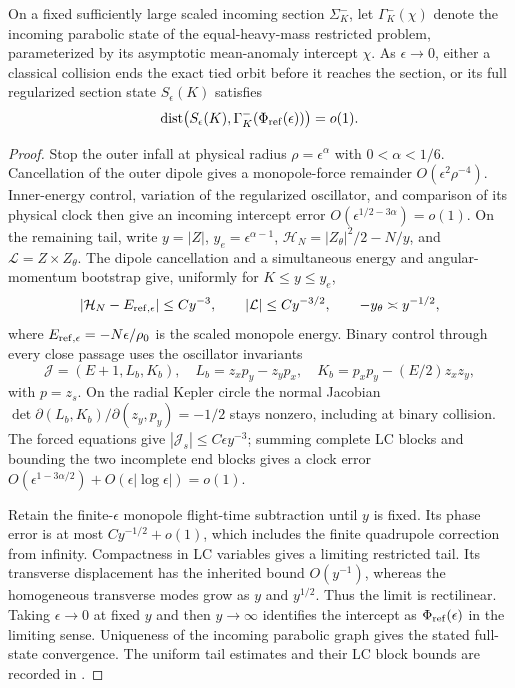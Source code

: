\begin{theorem}
On a fixed sufficiently large scaled incoming section $\Sigma_K^-$, let
$\Gamma_K^-(\chi)$ denote the incoming parabolic state of the equal-heavy-mass
restricted problem, parameterized by its asymptotic mean-anomaly intercept
$\chi$. As $\epsilon\to0$, either a classical collision ends the exact tied
orbit before it reaches the section, or its full regularized section state
$S_\epsilon(K)$ satisfies
\[
 \operatorname{dist}\bigl(S_\epsilon(K),
 \Gamma_K^-(\Phi_{\rm ref}(\epsilon))\bigr)=o(1).
\]
\end{theorem}
\begin{proof}
Stop the outer infall at physical radius $\rho=\epsilon^\alpha$ with
$0<\alpha<1/6$. Cancellation of the outer dipole gives a monopole-force
remainder $O(\epsilon^2\rho^{-4})$. Inner-energy control, variation of the
regularized oscillator, and comparison of its physical clock then give
an incoming intercept error $O(\epsilon^{1/2-3\alpha})=o(1)$.
On the remaining tail, write $y=|Z|$, $y_e=\epsilon^{\alpha-1}$,
$\mathcal H_N=|Z_\theta|^2/2-N/y$, and
$\mathcal L=Z\times Z_\theta$. The dipole cancellation and a simultaneous
energy and angular-momentum bootstrap give, uniformly for $K\le y\le y_e$,
\[
 |\mathcal H_N-E_{\rm ref,\epsilon}|\le Cy^{-3},\qquad
 |\mathcal L|\le Cy^{-3/2},\qquad -y_\theta\asymp y^{-1/2},
\]
where $E_{\rm ref,\epsilon}=-N\epsilon/\rho_0$ is the scaled monopole
energy. Binary control through every close passage uses the oscillator
invariants
\[
 \mathcal J=(E+1,L_b,K_b),\quad
 L_b=z_xp_y-z_yp_x,\quad K_b=p_xp_y-(E/2)z_xz_y,
\]
with $p=z_s$. On the radial Kepler circle the normal Jacobian
$\det\partial(L_b,K_b)/\partial(z_y,p_y)=-1/2$ stays nonzero, including
at binary collision. The forced equations give
$|\mathcal J_s|\le C\epsilon y^{-3}$; summing complete LC blocks and
bounding the two incomplete end blocks gives a clock error
$O(\epsilon^{1-3\alpha/2})+O(\epsilon|\log\epsilon|)=o(1)$.

Retain the finite-$\epsilon$ monopole flight-time subtraction until $y$
is fixed. Its phase error is at most $Cy^{-1/2}+o(1)$, which includes
the finite quadrupole correction from infinity. Compactness in LC
variables gives a limiting restricted tail. Its transverse displacement
has the inherited bound $O(y^{-1})$, whereas the homogeneous transverse
modes grow as $y$ and $y^{1/2}$. Thus the limit is rectilinear. Taking
$\epsilon\to0$ at fixed $y$ and then $y\to\infty$ identifies the
intercept as $\Phi_{\rm ref}(\epsilon)$ in the limiting sense.
Uniqueness of the incoming parabolic graph gives the stated full-state
convergence. The uniform tail estimates and their LC block bounds are
recorded in .
\end{proof}

